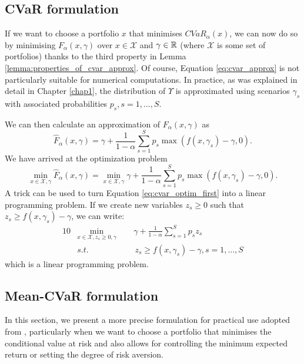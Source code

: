 \subsection{CVaR formulation}
If we want to choose a portfolio $x$ that minimises $CVaR_{\alpha}(x)$, we can now do so by minimising $F_{\alpha}(x,\gamma)$ over $x \in \mathcal{X}$ and $\gamma \in \mathbb{R}$ (where $\mathcal{X}$ is some set of portfolios) thanks to the third property in Lemma \ref{lemma:properties_of_cvar_approx}. Of course, Equation \ref{eq:cvar_approx} is not particularly suitable for numerical computations. In practice, as was explained in detail in Chapter \ref{chap1}, the distribution of $\Upsilon$ is approximated using scenarios $\gamma_s$ with associated probabilities $p_s, s=1,\dots,S$.

We can then calculate an approximation of $F_{\alpha}(x,\gamma)$ as
\begin{equation}
\label{eq:cvar_approx_approx}
\hat{F}_{\alpha}(x,\gamma)=\gamma + \frac{1}{1-\alpha} \sum_{s=1}^S  p_s \max (f(x,\gamma_s)- \gamma,0).
\end{equation}
We have arrived at the optimization problem
\begin{equation}
\label{eq:cvar_optim_first}
\underset{x \in \mathcal{X}, \gamma}{\min} \hat{F}_{\alpha}(x,\gamma)= \underset{x \in \mathcal{X}, \gamma}{\min} \gamma + \frac{1}{1-\alpha} \sum_{s=1}^S p_s \max (f(x,\gamma_s)-\gamma,0).
\end{equation}
A trick can be used to turn Equation \ref{eq:cvar_optim_first} into a linear programming problem. If we create new variables $z_s \geq 0$ such that $z_s \geq f(x,\gamma_s)-\gamma$, we can write:
\begin{alignat}{10}
& \underset{x \in \mathcal{X}, z_s \geq 0, \gamma}{\min}  \, \, \, && \gamma + \frac{1}{1-\alpha} \sum_{s=1}^S p_s z_s \\
&s.t. && \, z_s \geq f(x,\gamma_s)-\gamma, s=1,\dots,S
\end{alignat}
which is a linear programming problem.
\subsection{Mean-CVaR formulation}
In this section, we present a more precise formulation for practical use adopted from \cite{cvar_robust_mean_cvar_portfolio_optimization}, particularly when we want to choose a portfolio that minimises the conditional value at risk and also allows for controlling the minimum expected return or setting the degree of risk aversion.
